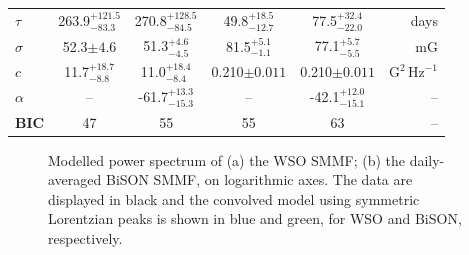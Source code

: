 \begin{table}[ht!]
\begin{center}
\begin{tabular}{l c c | c c r}
			{$\tau$} & {263.9$_{-83.3}^{+121.5}$} & {270.8$_{-84.5}^{+128.5}$} & {49.8$_{-12.7}^{+18.5}$} & {77.5$_{-22.0}^{+32.4}$} & {days} \\	
			
			{$\sigma$} & {52.3$\pm 4.6$} & {51.3$_{-4.5}^{+4.6}$} & {81.5$_{-1.1}^{+5.1}$} & {77.1$_{-5.5}^{+5.7}$} & {$\mathrm{mG}$} \\	
			
			{$c$} & {11.7$_{-8.8}^{+18.7}$} & {11.0$_{-8.4}^{+18.4}$} & {0.210$\pm 0.011$} & {0.210$\pm 0.011$} & {$\mathrm{G}^2 \, \mathrm{Hz}^{-1}$} \\	
			
			{$\alpha$} & {--} & {-61.7$_{-15.3}^{+13.3}$} & {--} & {-42.1$_{-15.1}^{+12.0}$} & {--} \\	
			\hline
			{\bf BIC} & {47} & {55} & {55} & {63} & {--} \\	
			\hline
		\end{tabular}
	\end{center}
\end{table}



\begin{figure}[ht!]
	\centering
	\qquad
	\caption{Modelled power spectrum of (a) the WSO SMMF; (b) the daily-averaged BiSON SMMF, on logarithmic axes. The data are displayed in black and the convolved model using symmetric Lorentzian peaks is shown in blue and green, for WSO and BiSON, respectively.} 
	\label{fig:WSO_and_24h_BiSON_PSD_fit}
\end{figure}

